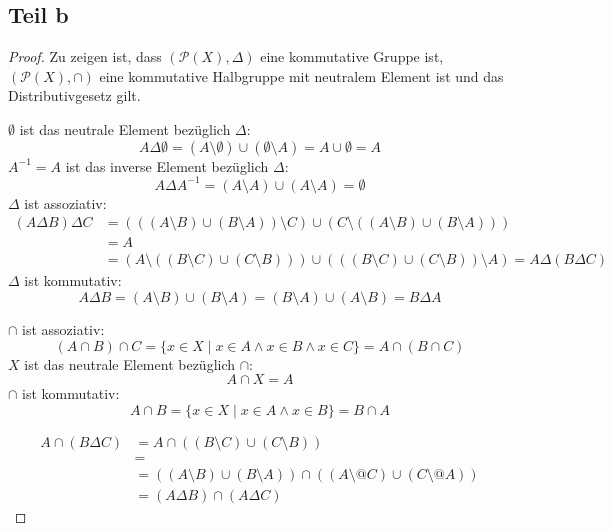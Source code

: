 \documentclass[10pt,a4paper]{article}
\begin{document}
\subsection{Teil b}
\begin{proof}
  Zu zeigen ist, dass $(\mathscr{P}(X), \Delta)$ eine kommutative Gruppe ist, $(\mathscr{P}(X), \cap)$ eine kommutative Halbgruppe mit neutralem Element ist und das Distributivgesetz gilt.
  
  $\emptyset$ ist das neutrale Element bezüglich $\Delta$:
  \begin{equation}
    A \Delta \emptyset = (A \setminus \emptyset) \cup (\emptyset \setminus A) = A \cup \emptyset = A
  \end{equation}
  $A^{-1} = A$ ist das inverse Element bezüglich $\Delta$:
  \begin{equation}
    A \Delta A^{-1} = (A \setminus A) \cup (A \setminus A) = \emptyset
  \end{equation}
  $\Delta$ ist assoziativ:
  \begin{align*}
    (A \Delta B) \Delta C & = (((A \setminus B) \cup (B \setminus A)) \setminus C) \cup (C \setminus ((A \setminus B) \cup (B \setminus A)))\\
    & = A\\
    & = (A \setminus ((B \setminus C) \cup (C \setminus B))) \cup (((B \setminus C) \cup (C \setminus B)) \setminus A) = A \Delta (B \Delta C)
  \end{align*}
  $\Delta$ ist kommutativ:
  \begin{equation}
    A \Delta B = (A \setminus B) \cup (B \setminus A) = (B \setminus A) \cup (A \setminus B) = B \Delta A
  \end{equation}
  
  $\cap$ ist assoziativ:
  \begin{equation}
    (A \cap B) \cap C = \{ x \in X \mid x \in A \land x \in B \land x \in C \} = A \cap (B \cap C)
  \end{equation}
  $X$ ist das neutrale Element bezüglich $\cap$:
  \begin{equation}
    A \cap X = A
  \end{equation}
  $\cap$ ist kommutativ:
  \begin{equation}
    A \cap B = \{ x \in X \mid x \in A \land x \in B \} = B \cap A
  \end{equation}
  
  \begin{align*}
    A \cap (B \Delta C) & = A \cap ((B \setminus C) \cup (C \setminus B))\\
    & = \\
    & = ((A \setminus B) \cup (B \setminus A)) \cap ((A \setminus@ C) \cup (C \setminus@ A))\\
    & = (A \Delta B) \cap (A \Delta C)
  \end{align*}
\end{proof}
\end{document}

